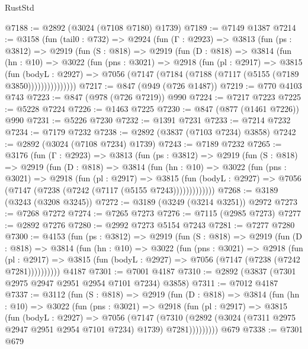 \begin{lexlean}{RustStd}
\begin{coremodule}
@7188 := @2892 (@3024 (@7108 @7180) @1739)
@7189 := @7149 @1387
@7214 := @3158
    (fun (tail0 : @732) =>
    @2924
      (fun (Γ : @2923) =>
      @3813
        (fun (ps : @3812) =>
        @2919
          (fun (S : @818) =>
          @2919
            (fun (D : @818) =>
            @3814
              (fun (hn : @10) =>
              @3022
                (fun (pns : @3021) =>
                @2918
                  (fun (pl : @2917) =>
                  @3815
                    (fun (bodyL : @2927) =>
                    @7056 (@7147 (@7184 (@7188 (@7117 (@5155 (@7189 @3850)))))))))))))))
@7217 := @847 (@949 (@726 @1487))
@7219 := @770 @4103 @743
@7223 := @847 (@978 (@726 @7219)) @990
@7224 := @7217 @7223
@7225 := @5228 @7224
@7226 := @1463 @7225
@7230 := @847 (@877 (@1461 @7226)) @990
@7231 := @5226 @7230
@7232 := @1391 @7231
@7233 := @7214 @7232
@7234 := @7179 @7232
@7238 := @2892 (@3837 (@7103 @7234) @3858)
@7242 := @2892 (@3024 (@7108 @7234) @1739)
@7243 := @7189 @7232
@7265 := @3176
    (fun (Γ : @2923) =>
    @3813
      (fun (ps : @3812) =>
      @2919
        (fun (S : @818) =>
        @2919
          (fun (D : @818) =>
          @3814
            (fun (hn : @10) =>
            @3022
              (fun (pns : @3021) =>
              @2918
                (fun (pl : @2917) =>
                @3815
                  (fun (bodyL : @2927) =>
                  @7056 (@7147 (@7238 (@7242 (@7117 (@5155 @7243)))))))))))))
@7268 := @3189 (@3243 (@3208 @3245))
@7272 := @3189 (@3249 (@3214 @3251)) @2972
@7273 := @7268 @7272
@7274 := @7265 @7273
@7276 := @7115 (@2985 @7273)
@7277 := @2892 @7276
@7280 := @2992 @7273 @5154 @7243
@7281 := @7277 @7280
@7300 := @4153
    (fun (ps : @3812) =>
    @2919
      (fun (S : @818) =>
      @2919
        (fun (D : @818) =>
        @3814
          (fun (hn : @10) =>
          @3022
            (fun (pns : @3021) =>
            @2918
              (fun (pl : @2917) =>
              @3815 (fun (bodyL : @2927) => @7056 (@7147 (@7238 (@7242 @7281))))))))))
    @4187
@7301 := @7001 @4187
@7310 := @2892 (@3837 (@7301 @2975 @2947 @2951 @2954 @7101 @7234) @3858)
@7311 := @7012 @4187
@7337 := @3112
    (fun (S : @818) =>
    @2919
      (fun (D : @818) =>
      @3814
        (fun (hn : @10) =>
        @3022
          (fun (pns : @3021) =>
          @2918
            (fun (pl : @2917) =>
            @3815
              (fun (bodyL : @2927) =>
              @7056
                (@7147
                  (@7310
                    (@2892 (@3024 (@7311 @2975 @2947 @2951 @2954 @7101 @7234) @1739) @7281)))))))))
    @679
@7338 := @7301 @679

\end{coremodule}
\end{lexlean}
